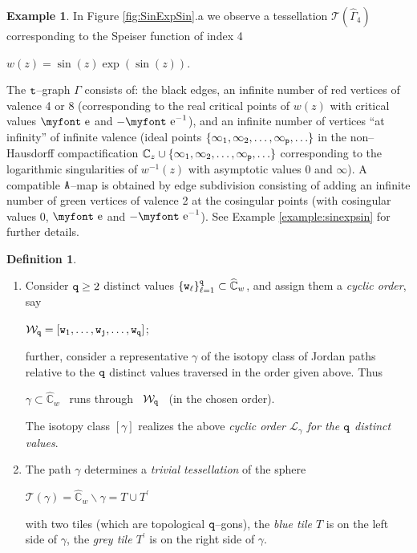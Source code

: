 \documentclass[final,3p,times]{elsarticle}
\newcommand{\CC}{\ensuremath{{\mathbb C}}}
\newcommand{\CW}{\ensuremath{{\widehat{\mathbb C}}}}
\newcommand{\e}{{\text{\myfont e}}}
\theoremstyle{definition}
\newtheorem{definition}[theorem]{Definition}
\newtheorem{example}{Example}[section]
\begin{document}
\begin{example}
In Figure \ref{fig:SinExpSin}.a we observe a tessellation 
$\mathscr{T}(\widehat{\Gamma}_4)$ 
corresponding to the Speiser function of index 4

\centerline{$w(z) = \sin (z) \exp (\sin (z))$.}

\noindent
The $\tt t$--graph $\Gamma$ consists of: the black edges, 
an infinite number of red vertices of valence 4 or 8 (corresponding to the real critical points of $w(z)$
with critical values $\e$ and $-\e^{-1}$), 
and an infinite number of vertices ``at infinity'' of infinite valence
(ideal points $\{\infty_1, \infty_2,\ldots,\infty_{\tt p},\ldots \}$ in the non--Hausdorff 
compactification $\CC_z \cup \{\infty_1,\infty_2,\ldots,\infty_{\tt p},\ldots \}$ 
corresponding to the 
logarithmic singularities of $w^{-1}(z)$ with asymptotic values $0$ and $\infty$).
A compatible $\tt A$--map is obtained by edge subdivision consisting 
of adding an infinite number of green vertices of valence 2 at the cosingular points (with cosingular 
values $0$, $\e$ and $-\e^{-1}$).
See Example \ref{example:sinexpsin} for further details.
\end{example}

\begin{definition}
\label{def:orden-ciclico-y-losetas}
\
\begin{enumerate}[label=\arabic*),leftmargin=*] 
\item
Consider ${\tt q}\geq 2$ distinct values $\{ {\tt w}_\ell \}_{ \ell=1}^{\tt q} \subset \CW_w$, 
and assign them a \emph{cyclic order}, say  

\centerline{$
\mathcal{W}_{\tt q} =
[{\tt w}_1, \ldots, 
{\tt w}_{\tt j}, \ldots,
{\tt w}_{\tt q} ] $;
}

\noindent 
further, consider a representative 
$\gamma$ of the isotopy class of Jordan paths relative to 
the $\tt q$ distinct values traversed in the order given above. Thus

\centerline{ 
$\gamma \subset \CW_w$ 
\ runs through \ 
$\mathcal{W}_{\tt q}$ \ (in the chosen order).
}

\noindent 
The isotopy class $[\gamma]$ realizes the above 
\emph{cyclic order $\mathcal{L}_\gamma$ for the $\tt q$ distinct values}.

\item
The path $\gamma$ determines a \emph{trivial tessellation} of the sphere

\centerline{
$\mathscr{T}(\gamma)  = 
\CW_w \backslash \gamma = T \cup T^\prime$}

\noindent
with two tiles (which are topological $\tt q$--gons), 
the \emph{blue tile $T$} is on the left side of $\gamma$, 
the \emph{grey tile $T^\prime$} is on the right side of $\gamma$.
\end{enumerate}
\end{definition}
\end{document}

